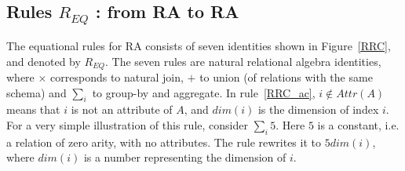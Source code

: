     






\subsection{Rules \texorpdfstring{$R_{EQ}$}{R\_EQ} : from RA to RA}

The equational rules for RA consists of seven identities shown in
Figure~\ref{RRC}, and denoted by $R_{EQ}$.  The seven rules are
natural relational algebra identities, where $\times$ corresponds to
natural join, $+$ to union (of relations with the same schema) and
$\sum_i$ to group-by and aggregate.  In rule~\ref{RRC_ac},
$i \notin Attr(A)$ means that $i$ is not an attribute of $A$, and
$dim(i)$ is the dimension of index $i$.  For a very simple
illustration of this rule, consider $\sum_i 5$.  Here $5$ is a
constant, i.e. a relation of zero arity, with no attributes.  The rule
rewrites it to $5 dim(i)$, where $dim(i)$ is a number representing the
dimension of $i$.

